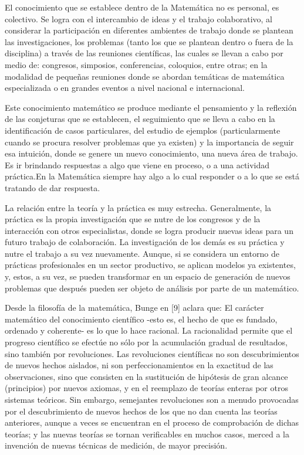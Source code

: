El conocimiento que se establece dentro de la Matemática no es personal, es colectivo. Se logra con el intercambio de ideas y el trabajo colaborativo, al considerar la participación en diferentes ambientes de trabajo donde se plantean las investigaciones, los problemas (tanto los que se plantean dentro o fuera de la disciplina) a través de las reuniones científicas, las cuales se llevan a cabo por medio de: congresos, simposios, conferencias, coloquios, entre otras; en la modalidad de pequeñas reuniones donde se abordan temáticas de matemática especializada o en grandes eventos a nivel nacional e internacional.  

Este conocimiento matemático se produce mediante el pensamiento y la reflexión de las conjeturas que se establecen, el seguimiento que se lleva a cabo en la identificación de casos particulares, del estudio de ejemplos (particularmente cuando se procura resolver problemas que ya existen) y la importancia de seguir esa intuición, donde se genere un nuevo conocimiento, una nueva área de trabajo. Es ir brindando respuestas a algo que viene en proceso, o a una actividad práctica.En la Matemática siempre hay algo a lo cual responder o a lo que se está tratando de dar respuesta.   

La relación entre la teoría y la práctica es muy estrecha. Generalmente, la práctica es la propia investigación que se nutre de los congresos y de la interacción con otros especialistas, donde se logra producir nuevas ideas para un futuro trabajo de colaboración. La investigación de los demás es su práctica y nutre el trabajo a su vez nuevamente. Aunque, si se considera un entorno de prácticas profesionales en un sector productivo, se aplican modelos ya existentes, y, estos, a su vez, se pueden transformar en un espacio de generación de nuevos problemas que después pueden ser objeto de análisis por parte de un matemático. 

    Desde la filosofía de la matemática, Bunge en [9] aclara que:   
    El carácter matemático del conocimiento científico -esto es, el hecho de que es fundado, ordenado y coherente- es lo que lo hace racional. La racionalidad permite que el progreso científico se efectúe no sólo por la acumulación gradual de resultados, sino también por revoluciones. Las revoluciones científicas no son descubrimientos de nuevos hechos aislados, ni son perfeccionamientos en la exactitud de las observaciones, sino que consisten en la sustitución de hipótesis de gran alcance (principios) por nuevos axiomas, y en el reemplazo de teorías enteras por otros sistemas teóricos.  Sin embargo, semejantes revoluciones son a menudo provocadas por el descubrimiento de nuevos hechos de los que no dan cuenta las teorías anteriores, aunque a veces se encuentran en el proceso de comprobación de dichas teorías; y las nuevas teorías se tornan verificables en muchos casos, merced a la invención de nuevas técnicas de medición, de mayor precisión. 

